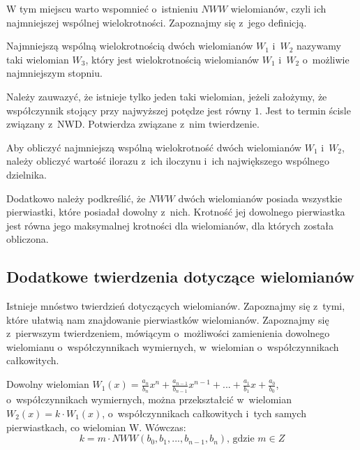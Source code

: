 W tym miejscu warto wspomnieć o~istnieniu $NWW$ wielomianów, czyli ich najmniejszej wspólnej wielokrotności. Zapoznajmy się z~jego definicją.

\begin{definition}
	$ $\\
	Najmniejszą wspólną wielokrotnością dwóch wielomianów $W_1$ i~$W_2$ nazywamy taki wielomian $W_3$, który jest wielokrotnością wielomianów $W_1$ i~$W_2$ o~możliwie najmniejszym stopniu.
\end{definition}

Należy zauwazyć, że istnieje tylko jeden taki wielomian, jeżeli założymy, że współczynnik stojący przy najwyższej potędze jest równy $1$. Jest to termin ścisle związany z~NWD. Potwierdza związane z~nim twierdzenie.

\begin{theorem}
	Aby obliczyć najmniejszą wspólną wielokrotność dwóch wielomianów $W_1$ i~$W_2$, należy obliczyć wartość ilorazu z~ich iloczynu i~ich największego wspólnego dzielnika.
\end{theorem}

Dodatkowo należy podkreślić, że $NWW$ dwóch wielomianów posiada wszystkie pierwiastki, które posiadał dowolny z~nich. Krotność jej dowolnego pierwiastka jest równa jego maksymalnej krotności dla wielomianów, dla których została obliczona.

\subsection{Dodatkowe twierdzenia dotyczące wielomianów}

Istnieje mnóstwo twierdzień dotyczących wielomianów. Zapoznajmy się z~tymi, które ułatwią nam znajdowanie pierwiastków wielomianów. Zapoznajmy się z~pierwszym twierdzeniem, mówiącym o~możliwości zamienienia dowolnego wielomianu o~współczynnikach wymiernych, w~wielomian o~współczynnikach całkowitych.

\begin{theorem}
	$ $\\
	Dowolny wielomian $W_1(x) = \frac{a_n}{b_n}x^n + \frac{a_{n-1}}{b_{n-1}}x^{n-1} + ... + \frac{a_1}{b_1}x + \frac{a_0}{b_0}$, o~współczynnikach wymiernych, można przekształcić w~wielomian $W_2(x) = k \cdot W_1(x)$, o~współczynnikach całkowitych i~tych samych pierwiastkach, co wielomian W. Wówczas:
	\begin{equation*}
	k = m \cdot NWW(b_0, b_1, ..., b_{n-1}, b_n)\text{, gdzie }m\in Z
	\end{equation*}
\end{theorem}

